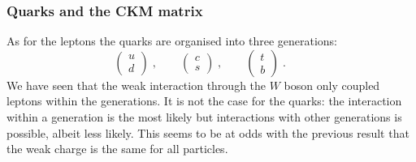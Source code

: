 \documentclass[12pt]{article}
\begin{document}
\subsubsection{Quarks and the CKM matrix}
%
%
As for the leptons the quarks are organised into three generations:
\[
\left(\begin{array}{c}u\\ d \end{array}\right)\;,\qquad
\left(\begin{array}{c}c\\ s \end{array}\right)\;,\qquad
\left(\begin{array}{c}t\\ b \end{array}\right)\;.\qquad
\]  
We have seen that the weak interaction through the $W$ boson only coupled leptons within the generations. It is not the case for the quarks: the interaction within a generation is the most likely but interactions with other generations is possible, albeit less likely. This seems to be at odds with the previous result that the weak charge is the same for all particles. 
\end{document}
